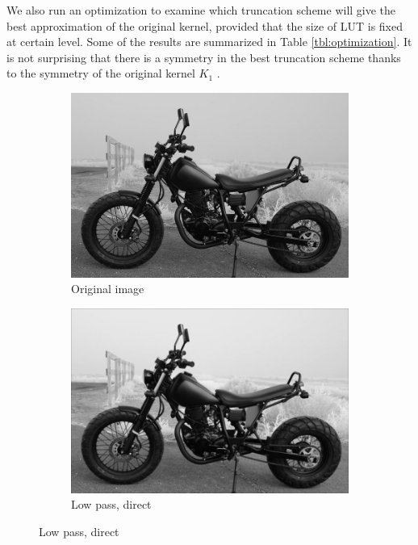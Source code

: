 \documentclass[12pt]{amsart}
\theoremstyle{definition}
\theoremstyle{remark}
\numberwithin{thm}{section}
\begin{document}
We also run an optimization to examine which truncation scheme will give the best approximation of the original kernel, provided that the size of LUT is fixed at certain level. Some of the results are summarized in Table \ref{tbl:optimization}. It is not surprising that there is a symmetry in the best truncation scheme thanks to the symmetry of the original kernel $K_1$ . 

\begin{figure}[h] \centering 
\begin{subfigure}[b]{0.4\textwidth} \includegraphics[width=\textwidth]{motor_original.png} \caption{Original image} %
\end{subfigure}
\begin{subfigure}[b]{0.4\textwidth} \includegraphics[width=\textwidth]{motor_direct.png} \caption{Low pass, direct}\end{subfigure}


\end{figure}
\end{document}
